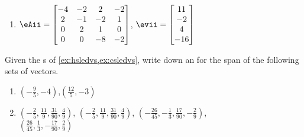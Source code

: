 \begin{exercise}
\begin{enumerate}
\item \(\eAii=\begin{bmatrix} -4&-2&2&-2
\\2&-1&-2&1
\\0&2&1&0
\\0&0&-8&-2 \end{bmatrix}\),
\(\evii=\begin{bmatrix} 11
\\-2
\\4
\\-16 \end{bmatrix}\)

\end{enumerate}
\end{exercise}




\begin{exercise}  
Given the \svd{}s of \cref{ex:hsledvs,ex:csledvs}, write down an  for the span of the following sets of vectors.
\begin{enumerate}
\item \((-\frac{9}{5},-4)\),\quad \((\frac{12}{5},-3)\)
\answer{\iv, \jv}


\item \((-\frac{2}{5},\frac{11}{9},\frac{31}{90},\frac{4}{9})\),\quad
\((-\frac{2}{5},\frac{11}{9},\frac{31}{90},\frac{4}{9})\),\quad
\((-\frac{26}{45},-\frac{1}{3},\frac{17}{90},-\frac{2}{9})\), \\
\((\frac{26}{45},\frac{1}{3},-\frac{17}{90},\frac{2}{9})\)

\end{enumerate}
\end{exercise}





